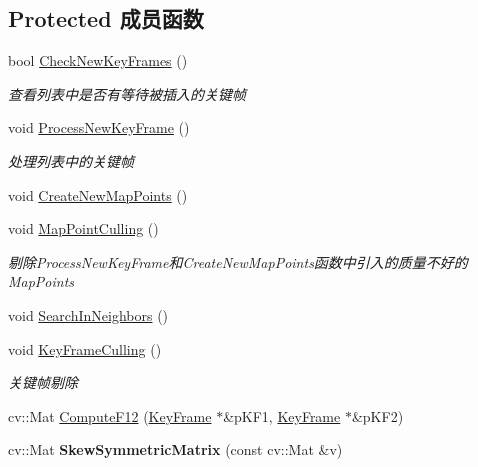 \subsection*{Protected 成员函数}
\begin{DoxyCompactItemize}
\item 
bool \hyperlink{classORB__SLAM2_1_1LocalMapping_a27db88f75fe6f2bd43b0bd0769d56462}{Check\-New\-Key\-Frames} ()
\begin{DoxyCompactList}\small\item\em 查看列表中是否有等待被插入的关键帧 \end{DoxyCompactList}\item 
void \hyperlink{classORB__SLAM2_1_1LocalMapping_a84eea8f268cce9d919a4906ae634dd22}{Process\-New\-Key\-Frame} ()
\begin{DoxyCompactList}\small\item\em 处理列表中的关键帧 \end{DoxyCompactList}\item 
void \hyperlink{classORB__SLAM2_1_1LocalMapping_ac06b513357429d9eff89e29d2ae58d6c}{Create\-New\-Map\-Points} ()
\item 
void \hyperlink{classORB__SLAM2_1_1LocalMapping_acbbb8f04b15e3250e0e24070825d19ae}{Map\-Point\-Culling} ()
\begin{DoxyCompactList}\small\item\em 剔除\-Process\-New\-Key\-Frame和\-Create\-New\-Map\-Points函数中引入的质量不好的\-Map\-Points \end{DoxyCompactList}\item 
void \hyperlink{classORB__SLAM2_1_1LocalMapping_a5d5e0bc6fd15d9a6bf1ca8a258f104f1}{Search\-In\-Neighbors} ()
\item 
void \hyperlink{classORB__SLAM2_1_1LocalMapping_aca73e5b4bace436b235dfa9c9a522b19}{Key\-Frame\-Culling} ()
\begin{DoxyCompactList}\small\item\em 关键帧剔除 \end{DoxyCompactList}\item 
cv\-::\-Mat \hyperlink{classORB__SLAM2_1_1LocalMapping_ac72419089ac268253671b8da2ec12c21}{Compute\-F12} (\hyperlink{classORB__SLAM2_1_1KeyFrame}{Key\-Frame} $\ast$\&p\-K\-F1, \hyperlink{classORB__SLAM2_1_1KeyFrame}{Key\-Frame} $\ast$\&p\-K\-F2)
\item 
\hypertarget{classORB__SLAM2_1_1LocalMapping_a4c5c0c57b580767a1dd642d77ad8179a}{cv\-::\-Mat {\bfseries Skew\-Symmetric\-Matrix} (const cv\-::\-Mat \&v)}\label{classORB__SLAM2_1_1LocalMapping_a4c5c0c57b580767a1dd642d77ad8179a}


\end{DoxyCompactItemize}
